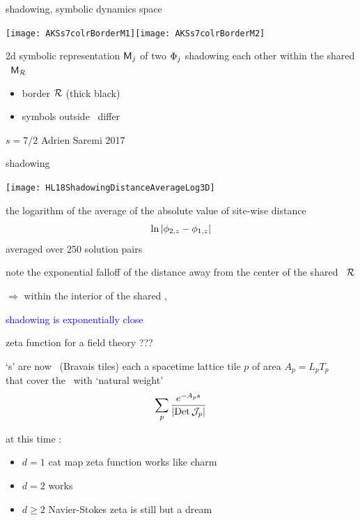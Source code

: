 \begin{frame}{shadowing, symbolic dynamics space}
\begin{center}
\texttt{[image: AKSs7colrBorderM1]}\hspace{0.7cm}\texttt{[image: AKSs7colrBorderM2]}
\end{center}
2d symbolic representation $\mathsf{M}_j$ of two {\twots} $\Phi_j$
shadowing each other within the shared
\brick\ $\mathsf{M}_{\mathcal{R}}$ %

\begin{itemize}
  \item border $\mathcal{R}$ (thick black) %
  \item symbols outside \R\ differ
\end{itemize}
\vfill
$s=7/2$    \hfill                          Adrien Saremi 2017
\end{frame}

\begin{frame}{shadowing} %
\begin{center}
\texttt{[image: HL18ShadowingDistanceAverageLog3D]}
\end{center}

\bigskip

the logarithm of the average of the absolute value of site-wise distance
\[
\ln|\phi_{2,z}-\phi_{1,z}|
\]
averaged over 250 solution pairs
\medskip

note the exponential falloff of the distance away from the center of the
shared \brick\ $\mathcal{R}$ %
\medskip

$\Rightarrow$ within the interior of the shared \brick,

\hfill \textcolor{blue}{shadowing is exponentially close}
\end{frame}

\begin{frame}{zeta function for a field theory ???} %
\begin{block}{`\po s' are now \twots\ (Bravais tiles)}
each a spacetime lattice tile  $p$ of area $A_p = L_p T_p$\\
that cover the \statesp\ with `natural weight'
\[
\sum_{p} \frac{e^{-A_p s}}
              {\left|\mbox{\rm Det}\,{\cal J}_p\right|}
\]
\end{block}

\vfill
at this time :
\begin{itemize}
\item $d=1$ cat map zeta function works like charm
\item $d=2$ {\catlatt} works
\item $d\geq2$ Navier-Stokes  zeta is still but a dream
\end{itemize}
\end{frame}

